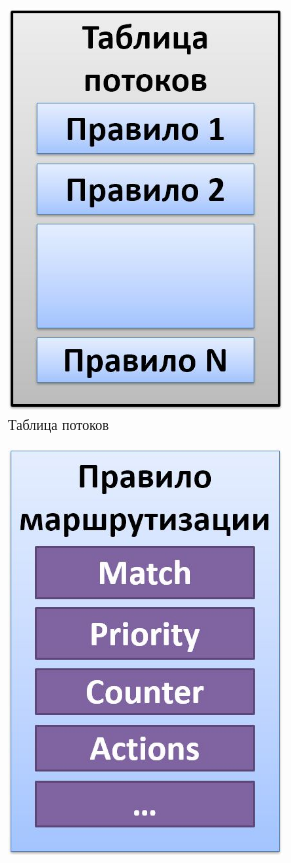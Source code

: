 \documentclass[../thesis.tex]{subfiles}
\begin{document}
\begin{figure}
\centering
\begin{subfigure}[b]{0.4\textwidth}
  \centering
  \includegraphics[width=0.8\textwidth]{figures/flowtable.jpg}
  \caption{Таблица потоков} \label{fig:flowtable}
\end{subfigure}
\begin{subfigure}[b]{0.4\textwidth}
  \centering
  \includegraphics[width=0.8\textwidth]{figures/flowrule.jpg}

\end{subfigure}
\end{figure}
\end{document}
